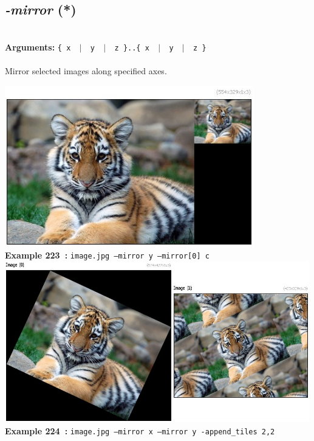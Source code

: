 \documentclass[a4paper,11pt,twoside]{book}
\begin{document}
\subsection{\emph{-mirror} (*)}\vspace*{-0.5em}
~\\\textbf{Arguments: } 
{\small \texttt{\{ x ~$|$~ y ~$|$~ z \}..\{ x ~$|$~ y ~$|$~ z \}}}\\~\\
Mirror selected images along specified axes.
\begin{center}\includegraphics[keepaspectratio=true,height=7cm,width=\textwidth]{img/gmic_def223.jpg}\\
{\footnotesize \textbf{Example 223~:} \texttt{image.jpg --mirror y --mirror[0] c}}
\\\includegraphics[keepaspectratio=true,height=7cm,width=\textwidth]{img/gmic_def224.jpg}\\
{\footnotesize \textbf{Example 224~:} \texttt{image.jpg --mirror x --mirror y -append\_tiles 2,2}}
\end{center}
\end{document}
